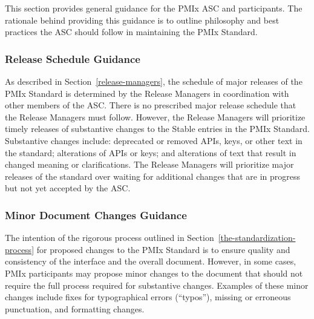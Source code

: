 \documentclass{article}
\begin{document}
This section provides general guidance for the PMIx ASC and participants.
The rationale behind providing this guidance is to outline
philosophy and best practices the ASC should follow in 
maintaining the PMIx Standard. 

\hypertarget{release-schedule-guidance}{%
\subsubsection{Release Schedule Guidance}%
\label{release-schedule-guidance}}

As described in Section~\ref{release-managers},
the schedule of major releases of the PMIx
Standard is determined by the Release Managers in coordination with other
members of the ASC. There is no prescribed major release schedule that the
Release Managers must follow. However, the Release Managers will prioritize
timely releases of substantive changes to the Stable entries in the 
PMIx Standard. Substantive changes
include: deprecated or removed
APIs, keys, or other text in the standard; alterations of APIs or keys; and
alterations of text that result in changed meaning or clarifications. The
Release Managers will prioritize major releases of the standard over waiting for
additional changes that are in progress but not yet accepted by the ASC.

\hypertarget{administrative-changes-guidance}{%
\subsubsection{Minor Document Changes Guidance}%
\label{administrative-changes-guidance}}

The intention of the rigorous process outlined in 
Section~\ref{the-standardization-process} for proposed
changes to the PMIx Standard is to ensure quality and consistency of 
the interface and the overall document. However, in some cases, 
PMIx participants may propose minor changes to the document that 
should not require the full process required for substantive changes. 
Examples of these minor changes include fixes for typographical errors 
(``typos''), missing or erroneous punctuation, and formatting changes.
\end{document}
